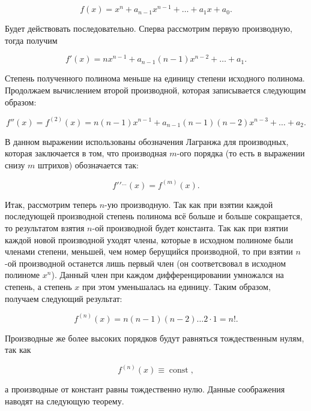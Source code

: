 \documentclass[12pt]{article}
\DeclareMathOperator\const{const}
\begin{document}
\begin{equation}
	f(x) = x^n + a_{n-1} x^{n-1} + \ldots + a_1 x + a_0.
\end{equation}

Будет действовать последовательно. Сперва рассмотрим первую производную, тогда получим

\begin{equation}
	f'(x) = nx^{n-1} + a_{n-1} (n-1) x^{n-2} + \ldots + a_1.
\end{equation}

Степень полученного полинома меньше на единицу степени исходного полинома. Продолжаем вычислением второй производной, которая записывается следующим образом:

\begin{equation}
	f''(x) = f^{(2)}(x) = n (n-1) x^{n-1} + a_{n-1} (n-1) (n-2) x^{n-3} + \ldots + a_2.
\end{equation}

В данном выражении использованы обозначения Лагранжа для производных, которая заключается в том, что производная $m$\--ого порядка (то есть в выражении снизу $m$ штрихов) обозначается так:

\begin{equation}
	f{}' {}' {}^{\ldots}(x) = f^{(m)}(x).
\end{equation}

Итак, рассмотрим теперь $n$\--ую производную. Так как при взятии каждой последующей производной степень полинома всё больше и больше сокращается, то результатом взятия $n$\--ой производной будет константа. Так как при взятии каждой новой производной уходят члены, которые в исходном полиноме были членами степени, меньшей, чем номер берущийся производной, то при взятии $n$\--ой производной останется лишь первый член (он соответсвовал в исходном полиноме $x^n$). Данный член при каждом дифференцировании умножался на степень, а степень $x$ при этом уменьшалась на единицу. Таким образом, получаем следующий результат:

\begin{equation}
	f^{(n)}(x) = n(n-1)(n-2)\ldots2\cdot 1 = n!.
\end{equation}

Производные же более высоких порядков будут равняться тождественным нулям, так как

\begin{equation}
	f^{(n)}(x) \equiv \const,
\end{equation}

а производные от констант равны тождественно нулю. Данные соображения наводят на следующую теорему.
\end{document}
